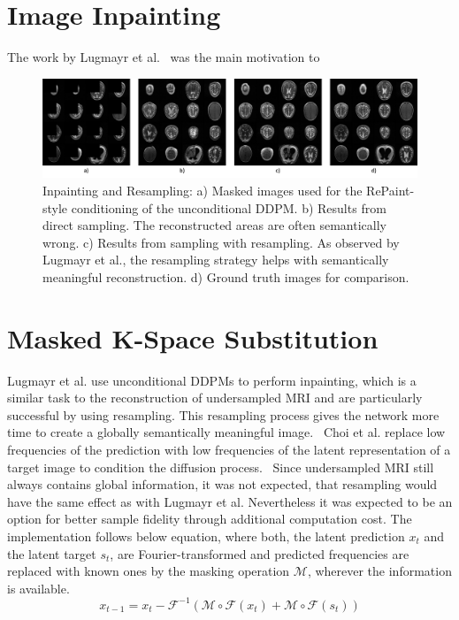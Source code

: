 \section{Image Inpainting}
The work by Lugmayr et al.~\autocite{lugmayr2022repaint} was the main motivation to
\begin{figure}[h]
    \centering
    \includegraphics[width=.8\textwidth]{images/repaint.png}
    \caption[Inpainting and Resampling]{Inpainting and Resampling: a) Masked images used for the RePaint-style conditioning of the unconditional DDPM. b) Results from direct sampling. The reconstructed areas are often semantically wrong. c) Results from sampling with resampling. As observed by Lugmayr et al., the resampling strategy helps with semantically meaningful reconstruction. d) Ground truth images for comparison.}
\end{figure}

\section{Masked K-Space Substitution}
Lugmayr et al. use unconditional DDPMs to perform inpainting, which is a similar task to the reconstruction of undersampled MRI and are particularly successful by using resampling. This resampling process gives the network more time to create a globally semantically meaningful image.~\autocite{lugmayr2022repaint} Choi et al. replace low frequencies of the prediction with low frequencies of the latent representation of a target image to condition the diffusion process.~\autocite{choi2021ilvr} Since undersampled MRI still always contains global information, it was not expected, that resampling would have the same effect as with Lugmayr et al. Nevertheless it was expected to be an option for better sample fidelity through additional computation cost. The implementation follows below equation, where both, the latent prediction $x_t$ and the latent target $s_t$, are Fourier-transformed and predicted frequencies are replaced with known ones by the masking operation $\mathcal{M}$, wherever the information is available.
\begin{equation}
    x_{t-1} = x_t - \mathcal{F}^{-1}\left(\mathcal{M}\circ\mathcal{F}(x_t) + \mathcal{M}\circ\mathcal{F}(s_t)\right)
\end{equation}


